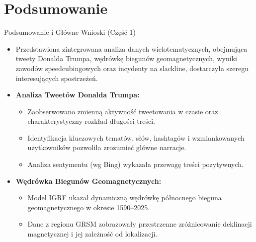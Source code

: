 \documentclass[10pt]{beamer} %
\begin{document}
\section*{Podsumowanie} %
\begin{frame}{Podsumowanie i Główne Wnioski (Część 1)}
  \begin{itemize}
    \item Przedstawiona zintegrowana analiza danych wielotematycznych, obejmująca tweety Donalda Trumpa, wędrówkę biegunów geomagnetycznych, wyniki zawodów speedcubingowych oraz incydenty na slackline, dostarczyła szeregu interesujących spostrzeżeń.

    \item \textbf{Analiza Tweetów Donalda Trumpa:}
    \begin{itemize}
        \item Zaobserwowano zmienną aktywność tweetowania w czasie oraz charakterystyczny rozkład długości treści.
        \item Identyfikacja kluczowych tematów, słów, hashtagów i wzmiankowanych użytkowników pozwoliła zrozumieć główne narracje.
        \item Analiza sentymentu (wg Bing) wykazała przewagę treści pozytywnych.
    \end{itemize}

    \item \textbf{Wędrówka Biegunów Geomagnetycznych:}
    \begin{itemize}
        \item Model IGRF ukazał dynamiczną wędrówkę północnego bieguna geomagnetycznego w okresie 1590--2025.
        \item Dane z regionu GRSM zobrazowały przestrzenne zróżnicowanie deklinacji magnetycznej i jej zależność od lokalizacji.
    \end{itemize}
  \end{itemize}
\end{frame}
\end{document}
